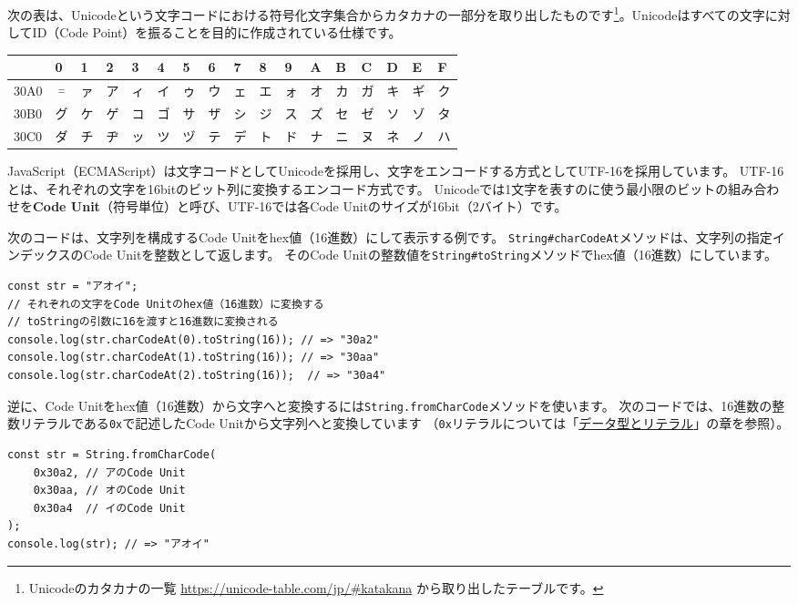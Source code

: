 次の表は、Unicodeという文字コードにおける符号化文字集合からカタカナの一部分を取り出したものです\footnote{Unicodeのカタカナの一覧
  \url{https://unicode-table.com/jp/\#katakana}
  から取り出したテーブルです。}。Unicodeはすべての文字に対してID（Code
Point）を振ることを目的に作成されている仕様です。

\begin{longtable}[]{@{}lllllllllllllllll@{}}
\toprule
& 0 & 1 & 2 & 3 & 4 & 5 & 6 & 7 & 8 & 9 & A & B & C & D & E &
F\tabularnewline
\midrule
\endhead
30A0 & ゠ & ァ & ア & ィ & イ & ゥ & ウ & ェ & エ & ォ & オ & カ & ガ &
キ & ギ & ク\tabularnewline
30B0 & グ & ケ & ゲ & コ & ゴ & サ & ザ & シ & ジ & ス & ズ & セ & ゼ &
ソ & ゾ & タ\tabularnewline
30C0 & ダ & チ & ヂ & ッ & ツ & ヅ & テ & デ & ト & ド & ナ & ニ & ヌ &
ネ & ノ & ハ\tabularnewline
\bottomrule
\end{longtable}

JavaScript（ECMAScript）は文字コードとしてUnicodeを採用し、文字をエンコードする方式としてUTF-16を採用しています。
UTF-16とは、それぞれの文字を16bitのビット列に変換するエンコード方式です。
Unicodeでは1文字を表すのに使う最小限のビットの組み合わせを\textbf{Code
Unit}（符号単位）と呼び、UTF-16では各Code
Unitのサイズが16bit（2バイト）です。

次のコードは、文字列を構成するCode
Unitをhex値（16進数）にして表示する例です。
\texttt{String\#charCodeAt}メソッドは、文字列の指定インデックスのCode
Unitを整数として返します。 そのCode
Unitの整数値を\texttt{String\#toString}メソッドでhex値（16進数）にしています。

\begin{lstlisting}
const str = "アオイ";
// それぞれの文字をCode Unitのhex値（16進数）に変換する
// toStringの引数に16を渡すと16進数に変換される
console.log(str.charCodeAt(0).toString(16)); // => "30a2"
console.log(str.charCodeAt(1).toString(16)); // => "30aa"
console.log(str.charCodeAt(2).toString(16));  // => "30a4"
\end{lstlisting}

逆に、Code
Unitをhex値（16進数）から文字へと変換するには\texttt{String.fromCharCode}メソッドを使います。
次のコードでは、16進数の整数リテラルである\texttt{0x}で記述したCode
Unitから文字列へと変換しています
（\texttt{0x}リテラルについては「\hyperlink{data-type-and-literal}{データ型とリテラル}」の章を参照）。

\begin{lstlisting}
const str = String.fromCharCode(
    0x30a2, // アのCode Unit
    0x30aa, // オのCode Unit
    0x30a4  // イのCode Unit
);
console.log(str); // => "アオイ"
\end{lstlisting}

